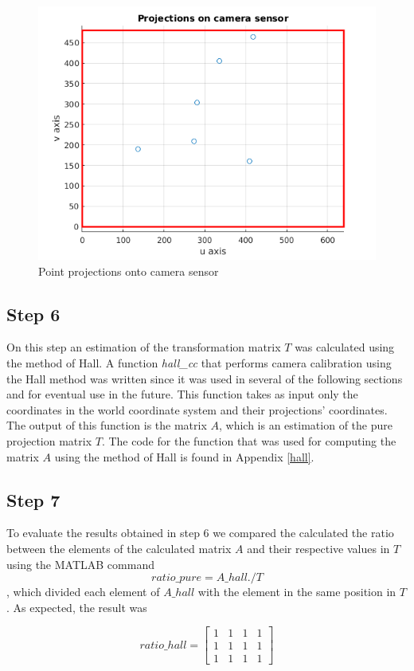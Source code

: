 \documentclass[journal]{IEEEtran}
\begin{document}
\begin{figure}[H]
	\centering
	\includegraphics[width=0.8\linewidth]{figures/projections.png}
	\caption{Point projections onto camera sensor}
	\label{projections}
\end{figure}


\subsection{Step 6}

On this step an estimation of the transformation matrix $T$ was calculated using the method of Hall. A function \textit{hall\_cc} that performs camera calibration using the Hall method was written since it was used in several of the following sections and for eventual use in the future. This function takes as input only the coordinates in the world coordinate system and their projections' coordinates. The output of this function is the matrix $A$, which is an estimation of the pure projection matrix $T$. The code for the function that was used for computing the matrix $A$ using the method of Hall is found in Appendix \ref{hall}.

\subsection{Step 7}

To evaluate the results obtained in step 6 we compared the calculated the ratio between the elements of the calculated matrix $A$ and their respective values in $T$ using the MATLAB command $$ratio\_pure = A\_hall./T$$, which divided each element of $A\_hall$ with the element in the same position in $T$. As expected, the result was

\[
ratio\_hall = 
\begin{bmatrix}
    1 & 1 & 1 & 1 \\
    1 & 1 & 1 & 1 \\
    1 & 1 & 1 & 1 
\end{bmatrix}
\]
\end{document}
